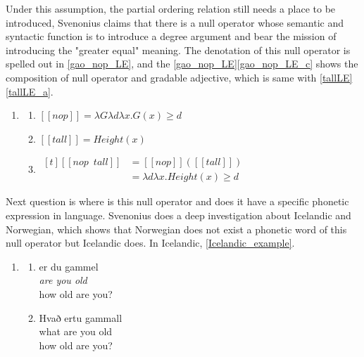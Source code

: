\documentclass{ctexart}
\begin{document}
Under this assumption, the partial ordering relation still needs a place to be introduced, Svenonius claims that there is a null operator whose semantic and syntactic function is to introduce a degree argument and bear the mission of introducing the "greater equal" meaning. The denotation of this null operator is spelled out in \ref{gao_nop_LE}, and the \ref{gao_nop_LE}\ref{gao_nop_LE_c} shows the composition of null operator and gradable adjective, which is same with \ref{tallLE}\ref{tallLE_a}.

\begin{enumerate}[resume]
    \item \label{gao_nop_LE}

    \begin{enumerate}
        \item \label{gao_nop_LE_a} 
        $[\![nop]\!]=\lambda G\lambda d \lambda x.G(x) \geq d$

        \item \label{gao_nop_LE_b} 
        $[\![tall]\!]=Height(x)$

        \item \label{gao_nop_LE_c} 
        $\begin{aligned}[t]
            [\![nop \enspace tall]\!] &= [\![nop]\!]([\![tall]\!]) \\
            &= \lambda d \lambda x.Height(x) \geq d
        \end{aligned}$

    \end{enumerate}
\end{enumerate}

Next question is where is this null operator and does it have a specific phonetic expression in language. Svenonius does a deep investigation about Icelandic and Norwegian, which shows that Norwegian does not exist a phonetic word of this null operator but Icelandic does. In Icelandic, \ref{Icelandic_example}.

\begin{enumerate}[resume]
    \item \label{Icelandic_example}
    
    \begin{enumerate}
        \item 
        er du gammel \\
        \textit{are you old} \\
        how old are you?
        
        \item 
        Hvað ertu gammall \\
        what are you old \\
        how old are you?

    \end{enumerate}   
    
\end{enumerate}
\end{document}
